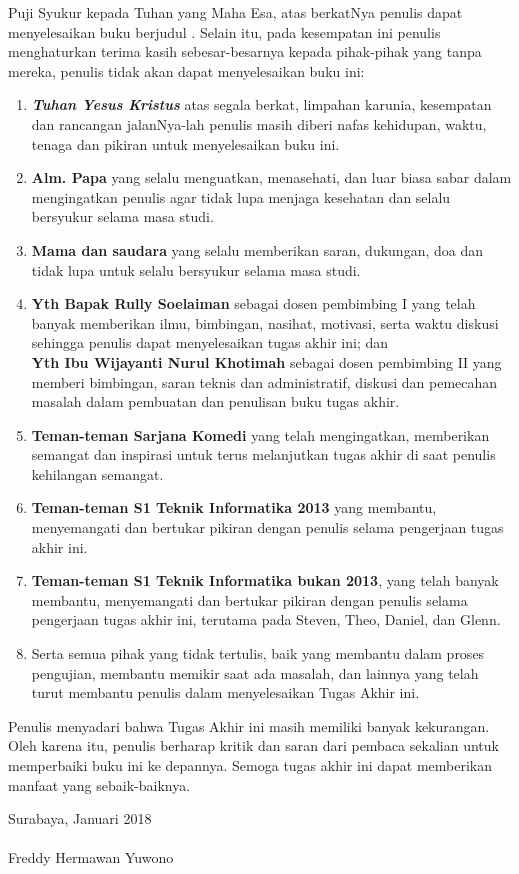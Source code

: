     
	  Puji Syukur kepada Tuhan yang Maha Esa, atas berkatNya penulis dapat menyelesaikan buku berjudul \textbf{\judul}. 
	  \newline
	  \indent Selain itu, pada kesempatan ini penulis menghaturkan terima kasih sebesar-besarnya kepada pihak-pihak yang tanpa mereka, penulis tidak akan dapat menyelesaikan buku ini:
  \begin{enumerate}
  	\item \textbf{\textit{Tuhan Yesus Kristus}} atas segala berkat, limpahan karunia, kesempatan dan rancangan jalanNya-lah penulis masih diberi nafas kehidupan, waktu, tenaga dan pikiran untuk menyelesaikan buku ini.
    \item \textbf{Alm. Papa} yang selalu menguatkan, menasehati, dan luar biasa sabar dalam mengingatkan penulis agar tidak lupa menjaga kesehatan dan selalu bersyukur selama masa studi.
    \item \textbf{Mama dan saudara} yang selalu memberikan saran, dukungan, doa dan tidak lupa untuk selalu bersyukur selama masa studi.
    \item \textbf{Yth Bapak Rully Soelaiman} sebagai dosen pembimbing I yang telah banyak memberikan ilmu, bimbingan, nasihat, motivasi, serta waktu diskusi sehingga penulis dapat menyelesaikan tugas akhir ini; dan \\
	    \textbf{Yth Ibu Wijayanti Nurul Khotimah} sebagai dosen pembimbing II yang memberi bimbingan, saran teknis dan administratif, diskusi dan pemecahan masalah dalam pembuatan dan penulisan buku tugas akhir.
    \item \textbf{Teman-teman Sarjana Komedi} yang telah mengingatkan, memberikan semangat dan inspirasi untuk terus melanjutkan tugas akhir di saat penulis kehilangan semangat.
    \item \textbf{Teman-teman S1 Teknik Informatika 2013} yang membantu, menyemangati dan bertukar pikiran dengan  penulis selama pengerjaan tugas akhir ini.
    \item \textbf{Teman-teman S1 Teknik Informatika bukan 2013}, yang telah banyak membantu, menyemangati dan bertukar pikiran dengan penulis selama pengerjaan tugas akhir ini, terutama pada Steven, Theo, Daniel, dan Glenn.
    \item Serta semua pihak yang tidak tertulis, baik yang membantu dalam proses pengujian, membantu memikir saat ada masalah, dan lainnya yang telah turut membantu penulis dalam menyelesaikan Tugas Akhir ini.
  \end{enumerate}
  
  \indent Penulis menyadari bahwa Tugas Akhir ini masih memiliki banyak kekurangan. Oleh karena itu, penulis berharap kritik dan saran dari pembaca sekalian untuk memperbaiki buku ini ke depannya. Semoga tugas akhir ini dapat memberikan manfaat yang sebaik-baiknya.

  \hfill Surabaya, Januari 2018 \\ \\ 


  \hfill Freddy Hermawan Yuwono

\cleardoublepage %

